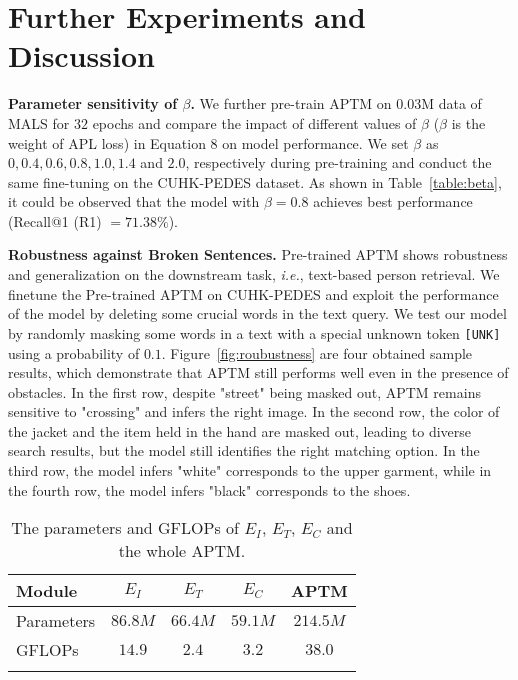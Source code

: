 \documentclass[sigconf]{acmart}
\def\ie{\emph{i.e.}}
\begin{document}
\section{Further Experiments and Discussion}
\textbf{Parameter sensitivity of $\beta$.} 
We further pre-train APTM on 0.03M data of MALS for $32$ epochs and compare the impact of different values of $\beta$ ($\beta$ is the weight of APL loss) in Equation 8 on model performance. 
We set $\beta$ as $0, 0.4, 0.6, 0.8, 1.0, 1.4$ and $2.0$, respectively during pre-training and conduct the same fine-tuning on the CUHK-PEDES dataset. 
As shown in Table~\ref{table:beta}, it could be observed that the model with $\beta = 0.8$ achieves best performance (Recall@1 (R1) $= 71.38 \%$).

  
\noindent\textbf{Robustness against Broken Sentences.} 
Pre-trained APTM shows robustness and generalization on the downstream task, \ie, text-based person retrieval. We finetune the Pre-trained APTM on CUHK-PEDES and exploit the performance of the model by deleting some crucial words in the text query. We test our model by randomly masking some words in a text with a special unknown token \texttt{[UNK]} using a probability of $0.1$. Figure~\ref{fig:roubustness} are four obtained sample results, which demonstrate that APTM still performs well even in the presence of obstacles. In the first row, despite "street" being masked out, APTM remains sensitive to "crossing" and infers the right image. In the second row, the color of the jacket and the item held in the hand are masked out, leading to diverse search results, but the model still identifies the right matching option. In the third row, the model infers "white" corresponds to the upper garment, while in the fourth row, the model infers "black" corresponds to the shoes.


\vspace{0.5cm}
\begin{table}[bp]
\small
\begin{center}
{
\setlength{\tabcolsep}{7pt}
\begin{tabular}{l|cccc}
\shline
Module          & $E_I$ & $E_T$ & $E_C$ & APTM \\
\hline
Parameters & $86.8M$ & $66.4M$ & $59.1M$ & $214.5M$ \\
GFLOPs     & $14.9$ & $2.4$ & $3.2$ & $38.0$ \\
\shline
\end{tabular}}
\end{center}
\caption{The parameters and GFLOPs of $E_I$, $E_T$, $E_C$ and the whole APTM.
}
\label{table:params}
\end{table}
\end{document}

